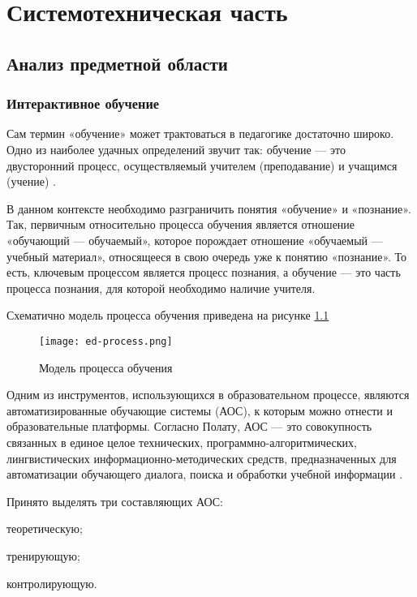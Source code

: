 \chapter{Системотехническая часть}

\section{Анализ предметной области}
\subsection{Интерактивное обучение}
Сам термин «обучение» может трактоваться в педагогике достаточно широко. Одно из наиболее удачных определений звучит так: обучение — это двусторонний процесс, осуществляемый учителем (преподавание) и учащимся (учение) \cite{pedDict}.

В данном контексте необходимо разграничить понятия «обучение» и «познание». Так, первичным относительно процесса обучения является отношение «обучающий — обучаемый», которое порождает отношение «обучаемый — учебный материал», относящееся в свою очередь уже к понятию «познание». То есть, ключевым процессом является процесс познания, а обучение — это часть процесса познания, для которой необходимо наличие учителя.

Схематично модель процесса обучения приведена на рисунке \ref{fig:ed-process}

\begin{figure}[htbp]
\centering
\texttt{[image: ed-process.png]}
\caption{Модель процесса обучения}%
\label{fig:ed-process}
\end{figure}

Одним из инструментов, использующихся в образовательном процессе, являются автоматизированные обучающие системы (АОС), к которым можно отнести и образовательные платформы. Согласно Полату, АОС — это совокупность связанных в единое целое технических, программно-алгоритмических, лингвистических информационно-методических средств, предназначенных для автоматизации обучающего диалога, поиска и обработки учебной информации \cite{Polat}.

Принято выделять три составляющих АОС:
\begin{itemize*}
\item теоретическую;
\item тренирующую;
\item контролирующую.
\end{itemize*}

